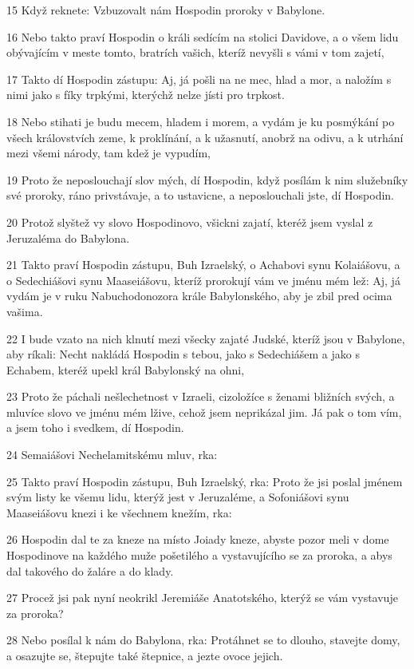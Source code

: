 \par 15 Když reknete: Vzbuzovalt nám Hospodin proroky v Babylone.
\par 16 Nebo takto praví Hospodin o králi sedícím na stolici Davidove, a o všem lidu obývajícím v meste tomto, bratrích vašich, kteríž nevyšli s vámi v tom zajetí,
\par 17 Takto dí Hospodin zástupu: Aj, já pošli na ne mec, hlad a mor, a naložím s nimi jako s fíky trpkými, kterýchž nelze jísti pro trpkost.
\par 18 Nebo stihati je budu mecem, hladem i morem, a vydám je ku posmýkání po všech královstvích zeme, k proklínání, a k užasnutí, anobrž na odivu, a k utrhání mezi všemi národy, tam kdež je vypudím,
\par 19 Proto že neposlouchají slov mých, dí Hospodin, když posílám k nim služebníky své proroky, ráno privstávaje, a to ustavicne, a neposlouchali jste, dí Hospodin.
\par 20 Protož slyštež vy slovo Hospodinovo, všickni zajatí, kteréž jsem vyslal z Jeruzaléma do Babylona.
\par 21 Takto praví Hospodin zástupu, Buh Izraelský, o Achabovi synu Kolaiášovu, a o Sedechiášovi synu Maaseiášovu, kteríž prorokují vám ve jménu mém lež: Aj, já vydám je v ruku Nabuchodonozora krále Babylonského, aby je zbil pred ocima vašima.
\par 22 I bude vzato na nich klnutí mezi všecky zajaté Judské, kteríž jsou v Babylone, aby ríkali: Necht nakládá Hospodin s tebou, jako s Sedechiášem a jako s Echabem, kteréž upekl král Babylonský na ohni,
\par 23 Proto že páchali nešlechetnost v Izraeli, cizoložíce s ženami bližních svých, a mluvíce slovo ve jménu mém lžive, cehož jsem neprikázal jim. Já pak o tom vím, a jsem toho i svedkem, dí Hospodin.
\par 24 Semaiášovi Nechelamitskému mluv, rka:
\par 25 Takto praví Hospodin zástupu, Buh Izraelský, rka: Proto že jsi poslal jménem svým listy ke všemu lidu, kterýž jest v Jeruzaléme, a Sofoniášovi synu Maaseiášovu knezi i ke všechnem knežím, rka:
\par 26 Hospodin dal te za kneze na místo Joiady kneze, abyste pozor meli v dome Hospodinove na každého muže pošetilého a vystavujícího se za proroka, a abys dal takového do žaláre a do klady.
\par 27 Procež jsi pak nyní neokrikl Jeremiáše Anatotského, kterýž se vám vystavuje za proroka?
\par 28 Nebo posílal k nám do Babylona, rka: Protáhnet se to dlouho, stavejte domy, a osazujte se, štepujte také štepnice, a jezte ovoce jejich.
